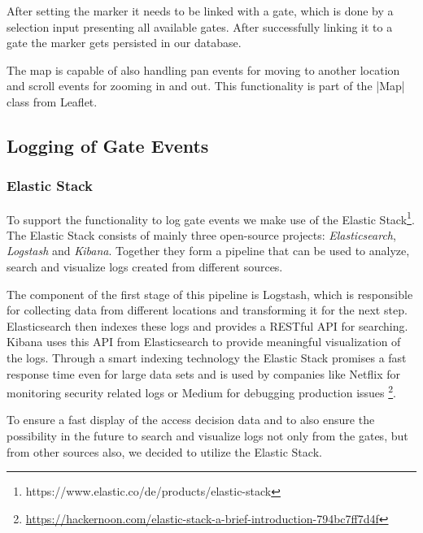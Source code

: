 After setting the marker it needs to be linked with a gate, which is done by a selection input presenting all available gates. After successfully linking it to a gate the marker gets persisted in our database.

The map is capable of also handling pan events for moving to another location and scroll events for zooming in and out. This functionality is part of the |Map| class from Leaflet.

\subsection{Logging of Gate Events}
\label{Logging of Gate Events}

\subsubsection{Elastic Stack}
\label{Elastic Stack}

To support the functionality to log gate events we make use of the Elastic Stack\footnote{https://www.elastic.co/de/products/elastic-stack}.
The Elastic Stack consists of mainly three open-source projects: \emph{Elasticsearch}, \emph{Logstash} and \emph{Kibana}.
Together they form a pipeline that can be used to analyze, search and visualize logs created from different sources. 

The component of the first stage of this pipeline is Logstash, which is responsible for collecting data from different locations and transforming it for the next step. Elasticsearch then indexes these logs and provides a RESTful API for searching. Kibana uses this API from Elasticsearch to provide meaningful visualization of the logs.
Through a smart indexing technology the Elastic Stack promises a fast response time even for large data sets and is used by companies like Netflix for monitoring security related logs or Medium for debugging production issues \footnote{\url{https://hackernoon.com/elastic-stack-a-brief-introduction-794bc7ff7d4f}}.

To ensure a fast display of the access decision data and to also ensure the possibility in the future to search and visualize logs not only from the gates, but from other sources also, we decided to utilize the Elastic Stack.

